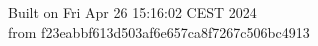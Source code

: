 {\noindent Built on Fri Apr 26 15:16:02 CEST 2024} \\ 
 {\noindent from f23eabbf613d503af6e657ca8f7267c506bc4913}
